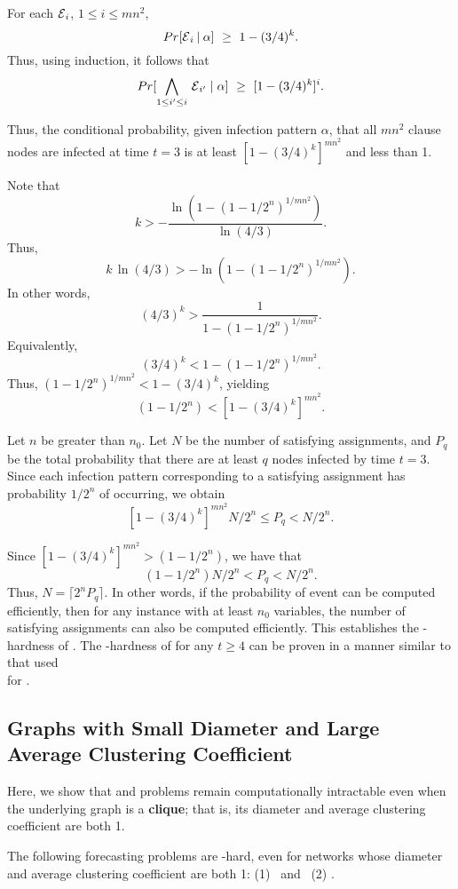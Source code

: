 \noindent
For each $\mbox{${\cal E}$}_i$, $1 \leq i \leq m n^2$, 
$$Pr[ \mbox{${\cal E}$}_i \:|\:  \alpha] ~\geq~ 1 - (3/4)^k.$$
Thus, using induction, it follows that
$$Pr[ \bigwedge_{1 \leq i' \leq i} \, \mbox{${\cal E}$}_{i'} \;|\;  \alpha] 
  ~\geq~ [1 - (3/4)^k]^i.$$

\noindent
Thus, the conditional probability, given infection pattern $\alpha$,
that all $m n^2$ clause nodes are infected at time $t = 3$ 
is at least $[1 - (3/4)^k]^{m n^2}$ and less than 1.

\medskip
Note that 
$$k > - \frac{\ln (1- (1-1/2^n)^{1/{m n^2}} )}{\ln(4/3)}.$$ 
Thus, 
$$k \, \ln(4/3) > -  \ln (1- (1-1/2^n)^{1/{m n^2}} ).$$
In other words, $$(4/3)^k > \frac{1}{1- (1-1/2^n)^{1/{m n^2}}}.$$
Equivalently,
$$(3/4)^k < 1- (1-1/2^n)^{1/{m n^2}}.$$
Thus, $(1-1/2^n)^{1/{m n^2}} < 1 - (3/4)^k$, yielding
$$(1-1/2^n) < [1 - (3/4)^k]^{m n^2}.$$

Let $n$ be greater than $n_0$.
Let $N$ be the number of satisfying assignments, and $P_q$ be the
total probability that there are at least $q$ nodes infected by
time $t = 3$.  Since each infection pattern corresponding to a
satisfying assignment has probability $1/2^n$ of occurring, we
obtain $$[1 - (3/4)^k]^{m n^2} N/2^n \leq P_q < N/2^n.$$

Since  $[1 - (3/4)^k]^{m n^2} > ( 1 - 1/2^n)$, we have that
$$( 1 - 1/2^n) N/2^n < P_q < N/2^n.$$
Thus, $N = \displaystyle{\lceil 2^n P_q \rceil}$.
In other words,
if the probability of event \cale{} can be computed 
efficiently, then for any \mtsat{} instance with at least $n_0$ variables,
the number of satisfying assignments can also be computed efficiently. 
This establishes the \cnump-hardness of \ThrTotInfv.
The \cnump-hardness of \tTotInfv{} for any $t \geq 4$ can be 
proven in a manner similar to that used \\ for \tNewInfv{}.
\QED


\subsection{Graphs with Small Diameter and Large Average Clustering
Coefficient}
\label{sse:dia_cc}

Here, we show that \TwoNewInfv{} and \TwoTotInfv{} problems
remain computationally intractable even when the underlying
graph is a \textbf{clique}; that is, its  diameter 
and average clustering coefficient are both 1.


\begin{theorem}\label{thm:dia_cc}
The following forecasting problems are \cnump-hard,
even for networks whose diameter and average clustering
coefficient are both 1: 
(1)  \TwoNewInfv{} ~and~ 
(2)  \TwoTotInfv.
\end{theorem}

